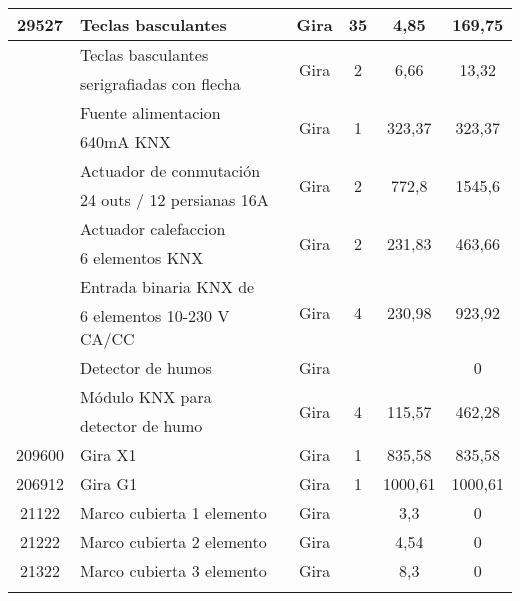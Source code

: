 \begin{flushleft}
\begin{table}[h]
\begin{longtable}{|c|p{4.5cm}|c|c|c|c|}
\hline
\rule[0mm]{0mm}{4mm}
29527 & Teclas basculantes & Gira & 35 & 4,85 & 169,75\\
\hline
\rule[0mm]{0mm}{4mm}
 \multirow{2}{*}{29427} & Teclas basculantes &  \multirow{2}{*}{Gira} &  \multirow{2}{*}{2} &  \multirow{2}{*}{6,66} &  \multirow{2}{*}{13,32}\\
 &  serigrafiadas con flecha & & & &\\
\hline
\rule[0mm]{0mm}{4mm}
\multirow{2}{*}{213000} & Fuente alimentacion& \multirow{2}{*}{Gira} & \multirow{2}{*}{1} & \multirow{2}{*}{323,37} & \multirow{2}{*}{323,37}\\
 &   640mA KNX  & & & &\\
\hline
\rule[0mm]{0mm}{4mm}
 \multirow{2}{*}{504000} & Actuador de conmutación &  \multirow{2}{*}{Gira} &  \multirow{2}{*}{2} &  \multirow{2}{*}{772,8} &  \multirow{2}{*}{1545,6}\\
 &  24 outs / 12 persianas 16A & & & &\\
\hline
\rule[0mm]{0mm}{4mm}
\multirow{2}{*}{212900} & Actuador calefaccion  & \multirow{2}{*}{Gira} & \multirow{2}{*}{2} & \multirow{2}{*}{231,83} & \multirow{2}{*}{463,66}\\
 & 6 elementos KNX & & & &\\
\hline
\rule[0mm]{0mm}{4mm}
 \multirow{2}{*}{212600} & Entrada binaria KNX de  &  \multirow{2}{*}{Gira} &  \multirow{2}{*}{4} &  \multirow{2}{*}{230,98} &  \multirow{2}{*}{923,92}\\
 & 6 elementos 10-230 V CA/CC & & & &\\
\hline
\rule[0mm]{0mm}{4mm}
 & Detector de humos & Gira &  &  & 0\\
\hline
\rule[0mm]{0mm}{4mm}
\multirow{2}{*}{234300} & Módulo KNX para  & \multirow{2}{*}{Gira} & \multirow{2}{*}{4} & \multirow{2}{*}{115,57} & \multirow{2}{*}{462,28}\\
 & detector de humo & & & &\\
\hline
\rule[0mm]{0mm}{4mm}
209600 & Gira X1 & Gira & 1 & 835,58 & 835,58\\
\hline
\rule[0mm]{0mm}{4mm}
206912 & Gira G1 & Gira & 1 & 1000,61 & 1000,61\\
\hline
\rule[0mm]{0mm}{4mm}
21122 & Marco cubierta 1 elemento & Gira &  & 3,3 & 0\\
\hline
\rule[0mm]{0mm}{4mm}
21222 & Marco cubierta 2 elemento & Gira &  & 4,54 & 0\\
\hline
\rule[0mm]{0mm}{4mm}
21322 & Marco cubierta 3 elemento & Gira &  & 8,3 & 0\\
\hline
\rule[0mm]{0mm}{4mm}

\end{longtable}
\end{table}
\end{flushleft}
